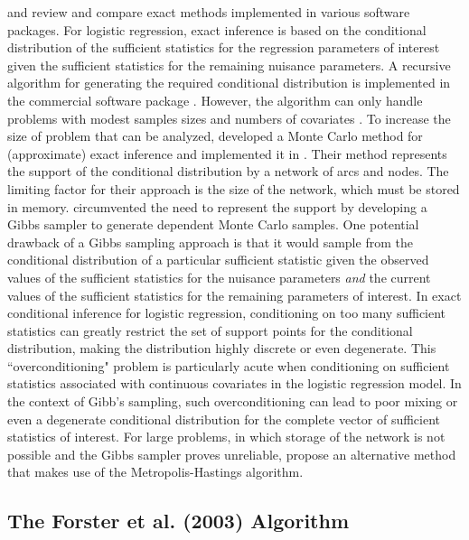\documentclass[article, shortnames]{jss}
\begin{document}
\cite{Oster:2002} and \cite{Oster:2003} review and compare exact
methods implemented in various software packages. For logistic
regression, exact inference is based on the conditional
distribution of the sufficient statistics for the regression
parameters of interest given the sufficient statistics for the
remaining nuisance parameters. A recursive algorithm for
generating the required conditional distribution is implemented in
the commercial software package  \citep{Cytel:1999}.
However, the algorithm can only handle problems with modest
samples sizes and numbers of covariates \citep{Corcoran:2001}. To
increase the size of problem that can be analyzed,
\citet{Mehta:2000} developed a Monte Carlo method for
(approximate) exact inference and implemented it in .
Their method represents the support of the conditional
distribution by a network of arcs and nodes. The limiting factor
for their approach is the size of the network, which must be
stored in memory. \citet{Forster:1996} circumvented the need to
represent the support by developing a Gibbs sampler to generate
dependent Monte Carlo samples. One potential drawback of a Gibbs
sampling approach is that it would sample from the conditional
distribution of a particular sufficient statistic given the
observed values of the sufficient statistics for the nuisance
parameters \emph{and} the current values of the sufficient
statistics for the remaining parameters of interest. In exact
conditional inference for logistic regression, conditioning on too
many sufficient statistics can greatly restrict the set of support
points for the conditional distribution, making the distribution
highly discrete or even degenerate. This ``overconditioning"
problem is particularly acute when conditioning on sufficient
statistics associated with continuous covariates in the logistic
regression model. In the context of Gibb's sampling, such
overconditioning can lead to poor mixing or even a degenerate
conditional distribution for the complete vector of sufficient
statistics of interest. For large problems, in which storage of
the network is not possible and the Gibbs sampler proves
unreliable, \citet{Forster:2003} propose an alternative method
that makes use of the Metropolis-Hastings algorithm.

\subsection{The Forster et al. (2003) Algorithm}
\end{document}
